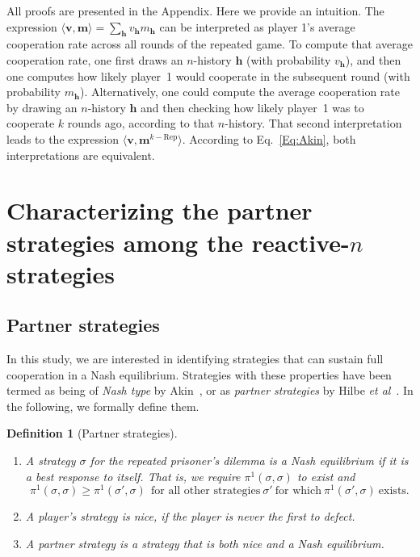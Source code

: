 \documentclass[11pt]{article}
\theoremstyle{plainCl1}
\theoremstyle{plainCl2}
\newtheorem*{definition}{Definition}
\begin{document}

\noindent
All proofs are presented in the Appendix. Here we provide an intuition.
The expression $\langle \mathbf{v}, \mathbf{m} \rangle \!=\! \sum_\mathbf{h} v_\mathbf{h}m_\mathbf{h}$ can be interpreted as player 1's average cooperation rate across all rounds of the repeated game.
To compute that average cooperation rate, one first draws an $n$-history $\mathbf{h}$ (with probability $v_\mathbf{h}$), and then one computes how likely player~1 would cooperate in the subsequent round (with probability $m_\mathbf{h}$). 
Alternatively, one could compute the average cooperation rate by drawing an $n$-history $\mathbf{h}$ and then checking how likely player~1 was to cooperate $k$ rounds ago, according to that $n$-history. 
That second interpretation leads to the expression $\langle \mathbf{v}, \mathbf{m}^{k-\text{Rep}} \rangle$. 
According to Eq.~\eqref{Eq:Akin}, both interpretations are equivalent.\\






\section{Characterizing the partner strategies among the reactive-$n$ strategies}
\label{section:results}

\subsection{Partner strategies}

In this study, we are interested in identifying strategies that can sustain full cooperation in a Nash equilibrium. 
Strategies with these properties have been termed as being of {\it Nash type} by Akin~\citep{akin:EGADS:2016}, or as {\it partner strategies} by Hilbe {\it et al}~\citep{Hilbe:GEB:2015}. 
In the following, we formally define them. 

\begin{definition}[Partner strategies]
~\\[-1cm]
{
\renewcommand\labelenumi{(\roman{enumi})}
\begin{enumerate}[noitemsep,topsep=0pt]
\item A strategy $\sigma$ for the repeated prisoner's dilemma is a {\it Nash equilibrium} if it is a best response to itself. 
That is, we require $\pi^1(\sigma,\sigma)$ to exist and
\begin{equation} \label{Eq:NashCondition}
\pi^1(\sigma,\sigma) \!\ge\! \pi^1(\sigma',\sigma) ~~\text{for all other strategies}~\sigma'~\text{for which}~ \pi^1(\sigma',\sigma)~\text{exists}. 
\end{equation}
\item A player's strategy is \textit{nice}, if the player is never the first to defect. 
\item A \textit{partner strategy} is a strategy that is both nice and a Nash equilibrium.
\end{enumerate}
}
\end{definition}
\end{document}

